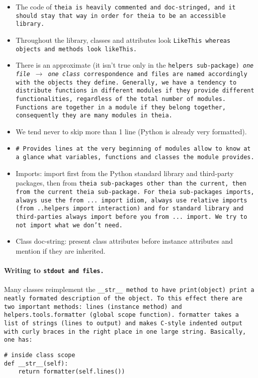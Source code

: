 \documentclass{article}
\begin{document}
\begin{itemize}
\item The code of \tt{theia} is heavily commented and doc-stringed, and it should stay that way in order for \tt{theia} to be an accessible library.

\item Throughout the library, classes and attributes look \tt{LikeThis} whereas objects and methods look \tt{likeThis}.

\item There is an approximate (it isn't true only in the \tt{helpers} sub-package) \textit{one file} $\rightarrow$ \textit{one class} correspondence and files are named accordingly with the objects they define. Generally, we have a tendency to distribute functions in different modules if they provide different functionalities, regardless of the total number of modules. Functions are together in a module if they belong together, consequently they are many modules in theia.

\item We tend never to skip more than 1 line (Python is already very formatted).

\item \tt{\# Provides} lines at the very beginning of modules allow to know at a glance what variables, functions and classes the module provides.

\item Imports: import first from the Python standard library and third-party packages, then from \tt{theia} sub-packages other than the current, then from the current \tt{theia} sub-package. For \tt{theia} sub-packages imports, always use the \tt{from ... import} idiom, always use relative imports (\tt{from ..helpers import interaction}) and for standard library and third-parties always \tt{import} before you \tt{from ... import}. We try to not import what we don't need.

\item Class doc-string: present class attributes before instance attributes and mention if they are inherited.
\end{itemize}

\paragraph{Writing to \tt{stdout} and files.}Many classes reimplement the \tt{\_\_str\_\_} method to have \tt{print(object)} print a neatly formated description of the object. To this effect there are two important methods: \tt{lines} (instance method) and \tt{helpers.tools.formatter} (global scope function). \tt{formatter} takes a list of strings (lines to output) and makes C-style indented output with curly braces in the right place in one large string. Basically, one has:

\begin{lstlisting}
# inside class scope
def __str__(self):
	return formatter(self.lines())
	
\end{lstlisting}
\end{document}
